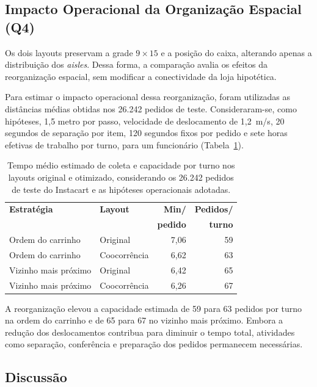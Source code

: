 \subsection{Impacto Operacional da Organização Espacial (Q4)}
\label{ssec:q4}

Os dois layouts preservam a grade $9 \times 15$ e a posição do caixa, alterando apenas a distribuição dos \textit{aisles}. Dessa forma, a comparação avalia os efeitos da reorganização espacial, sem modificar a conectividade da loja hipotética.

Para estimar o impacto operacional dessa reorganização, foram utilizadas as distâncias médias obtidas nos 26.242 pedidos de teste. Consideraram-se, como hipóteses, 1,5 metro por passo, velocidade de deslocamento de 1,2~m/s, 20 segundos de separação por item, 120 segundos fixos por pedido e sete horas efetivas de trabalho por turno, para um funcionário (Tabela~\ref{tab:operacional}).

\begin{table}[!ht]
\caption{Tempo médio estimado de coleta e capacidade por turno nos layouts original e otimizado, considerando os 26.242 pedidos de teste do Instacart e as hipóteses operacionais adotadas.}
\label{tab:operacional}
\centering
\small
\begin{tabular}{@{}p{}lrr@{}}
\hline
\textbf{Estratégia} & \textbf{Layout} & \textbf{Min/} & \textbf{Pedidos/} \\
 & & \textbf{pedido} & \textbf{turno} \\ \hline
Ordem do carrinho & Original & 7,06 & 59 \\
Ordem do carrinho & Coocorrência & 6,62 & 63 \\
Vizinho mais próximo & Original & 6,42 & 65 \\
Vizinho mais próximo & Coocorrência & 6,26 & 67 \\ \hline
\end{tabular}
\end{table}

A reorganização elevou a capacidade estimada de 59 para 63 pedidos por turno na ordem do carrinho e de 65 para 67 no vizinho mais próximo. Embora a redução dos deslocamentos contribua para diminuir o tempo total, atividades como separação, conferência e preparação dos pedidos permanecem necessárias.

\subsection{Discussão}
\label{ssec:discussao}

